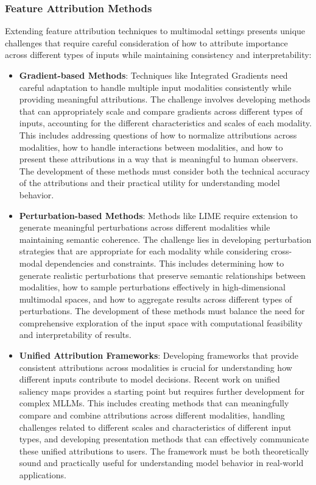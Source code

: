 \subsubsection{Feature Attribution Methods}
Extending feature attribution techniques to multimodal settings presents unique challenges that require careful consideration of how to attribute importance across different types of inputs while maintaining consistency and interpretability:

\begin{itemize}
    \item \textbf{Gradient-based Methods}: Techniques like Integrated Gradients \citep{sundararajan2017axiomatic} need careful adaptation to handle multiple input modalities consistently while providing meaningful attributions. The challenge involves developing methods that can appropriately scale and compare gradients across different types of inputs, accounting for the different characteristics and scales of each modality. This includes addressing questions of how to normalize attributions across modalities, how to handle interactions between modalities, and how to present these attributions in a way that is meaningful to human observers. The development of these methods must consider both the technical accuracy of the attributions and their practical utility for understanding model behavior.
    
    \item \textbf{Perturbation-based Methods}: Methods like LIME \citep{ribeiro2016should} require extension to generate meaningful perturbations across different modalities while maintaining semantic coherence. The challenge lies in developing perturbation strategies that are appropriate for each modality while considering cross-modal dependencies and constraints. This includes determining how to generate realistic perturbations that preserve semantic relationships between modalities, how to sample perturbations effectively in high-dimensional multimodal spaces, and how to aggregate results across different types of perturbations. The development of these methods must balance the need for comprehensive exploration of the input space with computational feasibility and interpretability of results.
    
    \item \textbf{Unified Attribution Frameworks}: Developing frameworks that provide consistent attributions across modalities is crucial for understanding how different inputs contribute to model decisions. Recent work on unified saliency maps \citep{rebuffi2020saliency} provides a starting point but requires further development for complex MLLMs. This includes creating methods that can meaningfully compare and combine attributions across different modalities, handling challenges related to different scales and characteristics of different input types, and developing presentation methods that can effectively communicate these unified attributions to users. The framework must be both theoretically sound and practically useful for understanding model behavior in real-world applications.
\end{itemize}


